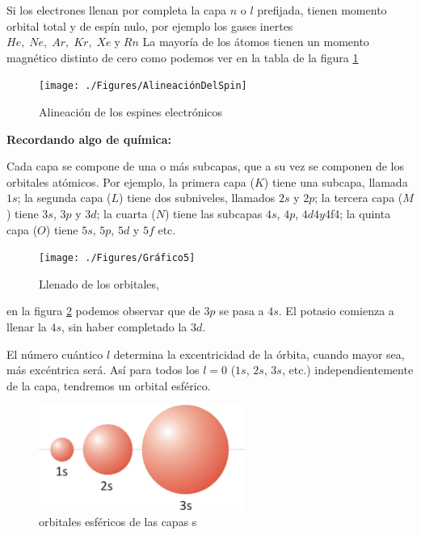 Si los electrones llenan por completa la capa $n$ o $l$ prefijada, tienen momento orbital total y de espín nulo, por ejemplo los gases inertes $He,\; Ne,\; Ar,\; Kr,\; Xe\; \text{y}\; Rn$  La mayoría de los átomos tienen un momento magnético distinto de cero como podemos ver en la tabla de la figura \ref{fig:GraficoAlineaciónDelSpin}


\begin{figure}[H]
    \centering
    \texttt{[image: ./Figures/AlineaciónDelSpin]}
	\caption{Alineación de los espines electrónicos}
	\label{fig:GraficoAlineaciónDelSpin}
\end{figure}


\textbf{Recordando algo de química:}

Cada capa se compone de una o más subcapas, que a su vez se componen de los orbitales atómicos. Por ejemplo, la primera capa ($K$) tiene una subcapa, llamada $1s$; la segunda capa ($L$) tiene dos subniveles, llamados $2s$ y $2p$; la tercera capa ($M$) tiene $3s$, $3p$ y $3d$; la cuarta ($N$) tiene las subcapas $4s$, $4p$, $4d4 y $4f4; la quinta capa ($O$) tiene $5s$, $5p$, $5d$ y $5f$ etc.

\begin{figure}[H]
    \centering
    \texttt{[image: ./Figures/Gráfico5]}
	\caption{Llenado de los orbitales,}
	\label{fig:Grafico5}
\end{figure}

en la figura \ref{fig:Grafico5} podemos observar que de $3p$ se pasa a $4s$. El potasio comienza a llenar la $4s$, sin haber completado la $3d$.

El número cuántico $l$ determina la excentricidad de la órbita, cuando mayor sea, más excéntrica será.
Así para todos los $l=0$ ($1s$, $2s$, $3s$, etc.) independientemente de la capa, tendremos un orbital esférico.

\begin{figure}[H]
    \centering
    \includegraphics[width=0.6\textwidth]{./Figures/1S2S3S}
	\caption{orbitales esféricos de las capas s}
	\label{fig:Grafico1s2s3s}
\end{figure}

